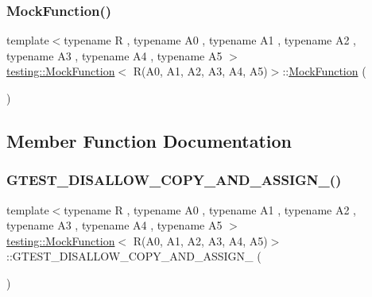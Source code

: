 \subsubsection{\texorpdfstring{MockFunction()}{MockFunction()}}
{\footnotesize\ttfamily template$<$typename R , typename A0 , typename A1 , typename A2 , typename A3 , typename A4 , typename A5 $>$ \\
\mbox{\hyperlink{classtesting_1_1_mock_function}{testing\+::\+Mock\+Function}}$<$ R(A0, A1, A2, A3, A4, A5)$>$\+::\mbox{\hyperlink{classtesting_1_1_mock_function}{Mock\+Function}} (\begin{DoxyParamCaption}{ }\end{DoxyParamCaption})\hspace{0.3cm}{\ttfamily [inline]}}



\subsection{Member Function Documentation}
\mbox{\label{classtesting_1_1_mock_function_3_01_r_07_a0_00_01_a1_00_01_a2_00_01_a3_00_01_a4_00_01_a5_08_4_a7634bc385fc1b89e053b991ec8672df9}} 
\subsubsection{\texorpdfstring{GTEST\_DISALLOW\_COPY\_AND\_ASSIGN\_()}{GTEST\_DISALLOW\_COPY\_AND\_ASSIGN\_()}}
{\footnotesize\ttfamily template$<$typename R , typename A0 , typename A1 , typename A2 , typename A3 , typename A4 , typename A5 $>$ \\
\mbox{\hyperlink{classtesting_1_1_mock_function}{testing\+::\+Mock\+Function}}$<$ R(A0, A1, A2, A3, A4, A5)$>$\+::G\+T\+E\+S\+T\+\_\+\+D\+I\+S\+A\+L\+L\+O\+W\+\_\+\+C\+O\+P\+Y\+\_\+\+A\+N\+D\+\_\+\+A\+S\+S\+I\+G\+N\+\_\+ (\begin{DoxyParamCaption}\item[{\mbox{\hyperlink{classtesting_1_1_mock_function}{Mock\+Function}}$<$ R(A0, A1, A2, A3, A4, A5)$>$}]{ }\end{DoxyParamCaption})\hspace{0.3cm}{\ttfamily [private]}}

